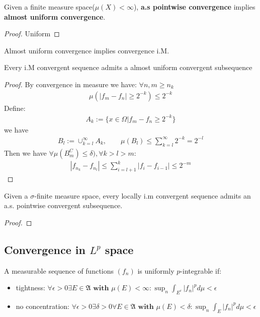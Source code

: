 \begin{theorem}
	Given a finite measure space($\mu(X) < \infty$),  \textbf{a.s pointwise convergence} implies \textbf{almost uniform convergence}.
\end{theorem}
\begin{proof}
	Uniform
\end{proof}

\begin{theorem}
	Almost uniform convergence implies convergence i.M.
\end{theorem}

\begin{theorem}
	Every i.M convergent sequence admits a almost uniform convergent subsequence
\end{theorem}
\begin{proof}
	By convergence in measure we have: $\forall n,m \geq n_k$
	\begin{align*}
		\mu(|f_m - f_n| \geq 2^{-k}) \le 2^{-k}
	\end{align*}
	Define:
	\begin{align*}
		A_k := \{ x \in \Omega| f_m - f_n \geq 2^{-k}\}
	\end{align*}
	we have 
	\begin{align*}
		B_l := \cup_{k = l}^\infty A_k ,\qquad 
		\mu(B_l) \le \sum_{k = l}^\infty 2^{-k} = 2^{-l}
	\end{align*}
	Then we have $\forall \mu(B_m^C) \le \delta), \forall k > l > m$:
	\begin{align*}
		|f_{n_k} - f_{n_l}| \le \sum_{i = l+ 1}^k |f_{i} - f_{i -1}| \le 2^{-m}
	\end{align*}
\end{proof}

\begin{theorem}
	Given a $\sigma$-finite measure space, every locally i.m convergent sequence admits an a.s. pointwise convergent subsequence.
\end{theorem}
\begin{proof}	
\end{proof}


\subsection{Convergence in \texorpdfstring{$L^p$}{Lp} space}
\begin{definition}
A measurable sequence of functions $(f_n)$ is uniformly $p$-integrable if:
\begin{itemize}
	\item tightness: $\forall \epsilon > 0 \exists E \in \mathfrak{A} \textbf{ with } \mu(E) < \infty: \sup_n \int_{E^c} |f_n|^p d\mu < \epsilon$
	\item no concentration: $\forall \epsilon > 0 \exists \delta > 0 \forall E \in \mathfrak{A} \textbf{ with } \mu(E)< \delta: \sup_n \int_E |f_n|^p d\mu < \epsilon $ 
\end{itemize}
\end{definition}


